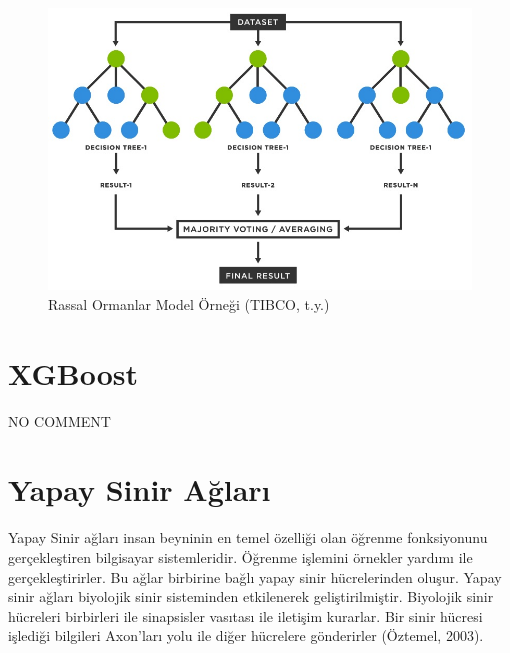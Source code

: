 \documentclass[12pt,twoside]{deuthesis}
\begin{document}
\begin{figure}

{\centering \includegraphics[width=1\linewidth,height=0.5\textheight]{figure/rf_example} 

}

\caption{Rassal Ormanlar Model Örneği (TIBCO, t.y.)}\label{fig:unnamed-chunk-7}
\end{figure}
\hypertarget{xgboost}{%
\section{XGBoost}\label{xgboost}}

NO COMMENT

\hypertarget{nn}{%
\section{Yapay Sinir Ağları}\label{nn}}

Yapay Sinir ağları insan beyninin en temel özelliği olan öğrenme fonksiyonunu gerçekleştiren bilgisayar sistemleridir. Öğrenme işlemini örnekler yardımı ile gerçekleştirirler. Bu ağlar birbirine bağlı yapay sinir hücrelerinden oluşur. Yapay sinir ağları biyolojik sinir sisteminden etkilenerek geliştirilmiştir. Biyolojik sinir hücreleri birbirleri ile sinapsisler vasıtası ile iletişim kurarlar. Bir sinir hücresi işlediği bilgileri Axon'ları yolu ile diğer hücrelere gönderirler (Öztemel, 2003).\\
\end{document}
